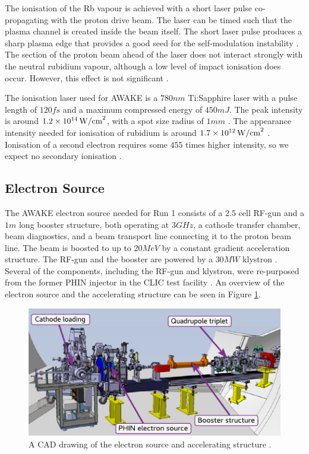The ionisation of the Rb vapour is achieved with a short laser pulse co-propagating with the proton drive beam. The laser can be timed such that the plasma channel is created inside the beam itself. The short laser pulse produces a sharp plasma edge that provides a good seed for the self-modulation instability \cite{vieira:2014a}. The section of the proton beam ahead of the laser does not interact strongly with the neutral rubidium vapour, although a low level of impact ionisation does occur. However, this effect is not significant \cite{awake_collaboration:2017}.

The ionisation laser used for AWAKE is a $780\unit{nm}$ Ti:Sapphire laser with a pulse length of $120\unit{fs}$ and a maximum compressed energy of $450\unit{mJ}$. The peak intensity is around $1.2\times 10^{14}\,\mathrm{W/cm}^{2}$, with a spot size radius of $1\unit{mm}$ \cite{awake_collaboration:2017}. The appearance intensity needed for ionisation of rubidium is around $1.7\times 10^{12}\,\mathrm{W/cm}^{2}$ \cite{augst:1989}. Ionisation of a second electron requires some $455$ times higher intensity, so we expect no secondary ionisation \cite{muggli:2017a}.

\subsection{Electron Source}
\label{WFA:Design:ESource}

The AWAKE electron source needed for Run 1 consists of a $2.5$ cell RF-gun and a $1\unit{m}$ long booster structure, both operating at $3\unit{GHz}$, a cathode transfer chamber, beam diagnostics, and a beam transport line connecting it to the proton beam line. The beam is boosted to up to $20\unit{MeV}$ by a constant gradient acceleration structure. The RF-gun and the booster are powered by a $30\unit{MW}$ klystron \cite{awake_collaboration:2017,pepitone:2016}. Several of the components, including the RF-gun and klystron, were re-purposed from the former PHIN injector in the CLIC test facility \cite{chevallay:2012}. An overview of the electron source and the accelerating structure can be seen in Figure \ref{Fig:WFA:ESource}.

\begin{figure}[hbt]
    \centering
    \includegraphics[width=0.70\linewidth,trim={0mm 0mm 0mm 0mm},clip]{figures/ElectronSource}
    \caption{\label{Fig:WFA:ESource} A CAD drawing of the electron source and accelerating structure \cite{pepitone:2016}.}
\end{figure}

